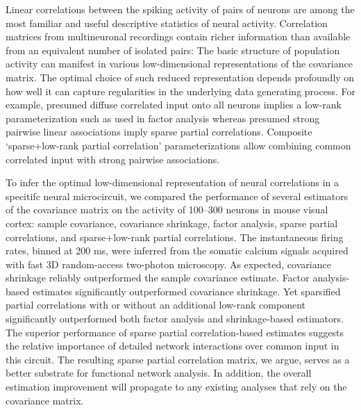 Linear correlations between the spiking activity of pairs of neurons are among the most familiar and useful descriptive statistics of neural activity.
Correlation matrices from multineuronal recordings contain richer information than available from an equivalent number of isolated pairs:
The basic structure of population activity can manifest in various low-dimensional representations of the covariance matrix.  The optimal choice of such reduced representation  depends profoundly on how well it can capture regularities in the underlying data generating process. 
For example, presumed diffuse correlated input onto all neurons implies a low-rank parameterization such as used in  factor analysis whereas presumed strong pairwise linear associations imply sparse partial correlations.  
Composite  `sparse+low-rank partial correlation' parameterizations allow combining common correlated input with strong pairwise associations.  

To infer the optimal low-dimensional representation of neural correlations in a specitifc neural microcircuit, we compared the performance of several estimators of the covariance matrix on the activity of 100--300 neurons in mouse visual cortex: sample covariance, covariance shrinkage, factor analysis, sparse partial correlations, and sparse+low-rank partial correlations. 
The instantaneous firing rates, binned at 200 ms, were inferred from the somatic calcium signals acquired with fast 3D random-access two-photon microscopy.   
As expected, covariance shrinkage reliably outperformed the sample covariance estimate.
Factor analysis-based estimates significantly outperformed covariance shrinkage.
Yet sparsified partial correlations with or without an additional low-rank component significantly outperformed both factor analysis and shrinkage-based  estimators.
The superior performance of sparse partial correlation-based estimates suggests the relative importance of detailed network interactions over common input in this circuit.
The resulting sparse partial correlation matrix, we argue, serves as a better substrate for functional network analysis. 
In addition, the overall estimation improvement will propagate to any existing analyses that rely on the covariance matrix. 